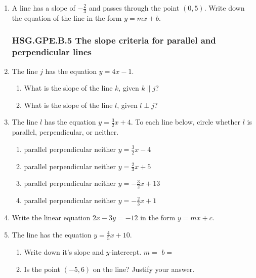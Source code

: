 \begin{enumerate}
\item A line has a slope of $-\frac{2}{3}$ and passes through the point $(0, 5)$. Write down the equation of the line in the form $y=mx+b$. \vspace{3cm}

\newpage
\subsubsection*{HSG.GPE.B.5 The slope criteria for parallel and perpendicular lines}
\item The line $j$ has the equation $y=4x-1$.
  \begin{enumerate}
    \item What is the slope of the line $k$, given $k \parallel j$?
    \vspace{1cm}
    \item What is the slope of the line $l$, given $l \perp j$?
    \vspace{1cm}
  \end{enumerate}

\item The line $l$ has the equation $y=\frac{3}{2}x+4$. To each line below, circle whether $l$ is parallel, perpendicular, or neither.
\begin{enumerate}
  \item parallel \quad perpendicular \quad neither \qquad $y=\frac{3}{2}x-4$
  \vspace{0.5cm}
  \item parallel \quad perpendicular \quad neither \qquad $y=\frac{2}{3}x+5$
  \vspace{0.5cm}
  \item parallel \quad perpendicular \quad neither \qquad $y=-\frac{3}{2}x+13$
  \vspace{0.5cm}
  \item parallel \quad perpendicular \quad neither \qquad $y=-\frac{2}{3}x+1$
  \vspace{0.5cm}
\end{enumerate}


\item Write the linear equation $2x-3y=-12$ in the form $y=mx+c$. \vspace{4cm}

\item The line has the equation $y=\frac{4}{5}x+10$. 
\begin{enumerate}
  \item Write down it's slope and $y$-intercept. \hspace{1cm} $m=$
  \hspace{2cm} $b=$
  \item Is the point $(-5, 6)$ on the line? Justify your answer.
\end{enumerate}
\vspace{4cm}

\end{enumerate}
